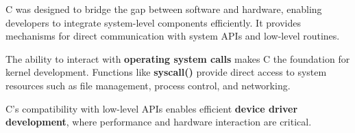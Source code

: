 \begin{NxSSSSBox}
	\begin{NxIDBox}
		C was designed to bridge the gap between software and hardware, enabling developers to integrate system-level components efficiently. It provides mechanisms for direct communication with system APIs and low-level routines.
	\end{NxIDBox}
\end{NxSSSSBox}


\bigskip

\begin{NxSSSSBox}[breakable]
	\begin{NxIDBox}
		The ability to interact with \textbf{operating system calls} makes C the foundation for kernel development. Functions like \textbf{syscall()} provide direct access to system resources such as file management, process control, and networking.
	\end{NxIDBox}
	\begin{NxIDBox}
		C's compatibility with low-level APIs enables efficient \textbf{device driver development}, where performance and hardware interaction are critical.
	\end{NxIDBox}
\end{NxSSSSBox}


